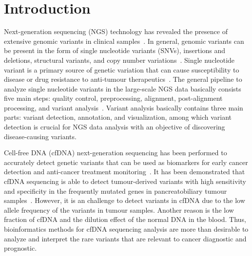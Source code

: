 \documentclass[a4,center,fleqn]{NAR}
\begin{document}
\section{Introduction}
Next-generation sequencing (NGS) technology has revealed the presence of extensive genomic variants in clinical samples~\citep{koboldt2013next}.
In general, genomic variants can be present in the form of single nucleotide variants (SNVs), insertions and deletions, structural variants, and copy number variations~\citep{Bao2014}.
Single nucleotide variant is a primary source of genetic variation that can cause susceptibility to disease or drug resistance to anti-tumour therapeutics~\citep{kessler2014resistance}.
The general pipeline to analyze single nucleotide variants in the large-scale NGS data basically consists five main steps: quality control, preprocessing, alignment, post-alignment processing, and variant analysis~\citep{pabinger2014survey, Bao2014}.
Variant analysis basically contains three main parts: variant detection, annotation, and visualization, among which variant detection is crucial for NGS data analysis with an objective of discovering disease-causing variants.


Cell-free DNA (cfDNA) next-generation sequencing has been performed to accurately detect genetic variants that can be used as biomarkers for early cancer detection and anti-cancer treatment monitoring~\citep{schwarzenbach2011cell, zhou2014pilot}.
It has been demonstrated that cfDNA sequencing is able to detect tumour-derived variants with high sensitivity and specificity in the frequently mutated genes in pancreatobiliary tumour samples~\citep{zill2015cell}.
However, it is an challenge to detect variants in cfDNA due to the low allele frequency of the variants in tumour samples.
Another reason is the low fraction of cfDNA and the dilution effect of the normal DNA in the blood. 
Thus, bioinformatics methods for cfDNA sequencing analysis are more than desirable to analyze and interpret the rare variants that are relevant to cancer diagnostic and prognostic.
\end{document}
